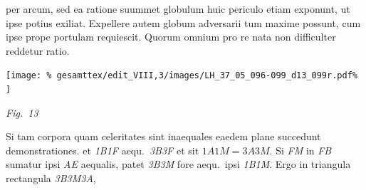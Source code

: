 \protect{} per arcum, 
%
 sed ea ratione suummet globulum%
\protect{} huic periculo etiam exponunt, ut ipse potius exiliat. Expellere autem globum  
%
adversarii tum maxime possunt, cum ipse prope portulam requiescit. Quorum omnium pro re nata 
%
non difficulter reddetur ratio.%
\pend
% 
%
\vspace{2.0em} %
\centerline{%
\texttt{[image: \%
gesamttex/edit\_VIII,3/images/LH\_37\_05\_096-099\_d13\_099r.pdf\%
]}} 
\vspace{0.5em}
\centerline{%
\lbrack\textit{Fig.~13}\rbrack%
}
\vspace{1.5em}
%
\pstart
{}%
%
Si tam corpora\protect{} quam celeritates%
\protect{} sint inaequales eaedem plane succedunt demonstrationes.  
%
%
et \textit{{\scriptsize1}B{\scriptsize1}F} aequ.\ \textit{{\scriptsize3}B{\scriptsize3}F} et sit  
%
%
${\scriptstyle \textit{1}}A{\scriptstyle \textit{1}}M = {\scriptstyle \textit{3}}A{\scriptstyle \textit{3}}M$. Si 
%
%
\textit{FM} in \textit{FB} sumatur ipsi \textit{AE} aequalis, patet \textit{{\scriptsize3}B{\scriptsize3}M} fore aequ.\ ipsi 
%
 \textit{{\scriptsize1}B{\scriptsize1}M}. Ergo in triangula rectangula \textit{{\scriptsize3}B{\scriptsize3}M{\scriptsize3}A}, 
